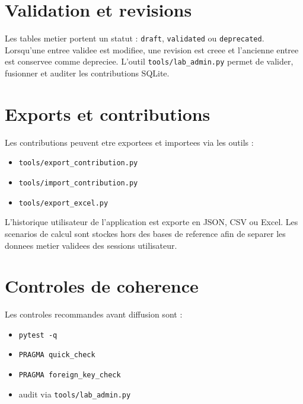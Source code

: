 \documentclass[11pt,a4paper]{article}
\begin{document}
\section{Validation et revisions}

Les tables metier portent un statut : \texttt{draft}, \texttt{validated} ou
\texttt{deprecated}. Lorsqu'une entree validee est modifiee, une revision est
creee et l'ancienne entree est conservee comme depreciee. L'outil
\texttt{tools/lab\_admin.py} permet de valider, fusionner et auditer les
contributions SQLite.

\section{Exports et contributions}

Les contributions peuvent etre exportees et importees via les outils :

\begin{itemize}
  \item \texttt{tools/export\_contribution.py}
  \item \texttt{tools/import\_contribution.py}
  \item \texttt{tools/export\_excel.py}
\end{itemize}

L'historique utilisateur de l'application est exporte en JSON, CSV ou Excel.
Les scenarios de calcul sont stockes hors des bases de reference afin de
separer les donnees metier validees des sessions utilisateur.

\section{Controles de coherence}

Les controles recommandes avant diffusion sont :

\begin{itemize}
  \item \texttt{pytest -q}
  \item \texttt{PRAGMA quick\_check}
  \item \texttt{PRAGMA foreign\_key\_check}
  \item audit via \texttt{tools/lab\_admin.py}
\end{itemize}
\end{document}
